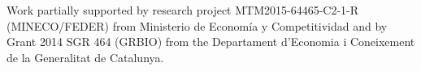 
\colorbox{qmuldarkblue}
{
 \color{white}
 \parbox{1.0\textwidth}
 {

{\small
	Work partially supported by research project MTM2015-64465-C2-1-R (MINECO/FEDER) from Ministerio de Economía y Competitividad and  by Grant 2014 SGR 464 (GRBIO) from the Departament d'Economia i Coneixement de la Generalitat de Catalunya.  
}%
 }
}
